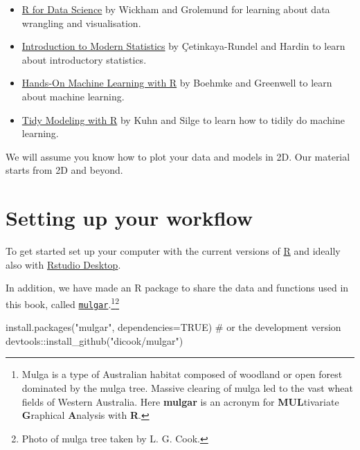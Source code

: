 \documentclass[
  letterpaper,
]{krantz}
\newenvironment{Shaded}{\begin{snugshade}}{\end{snugshade}}
\newcommand{\AttributeTok}[1]{\textcolor[rgb]{0.40,0.45,0.13}{#1}}
\newcommand{\CommentTok}[1]{\textcolor[rgb]{0.37,0.37,0.37}{#1}}
\newcommand{\ConstantTok}[1]{\textcolor[rgb]{0.56,0.35,0.01}{#1}}
\newcommand{\FunctionTok}[1]{\textcolor[rgb]{0.28,0.35,0.67}{#1}}
\newcommand{\NormalTok}[1]{\textcolor[rgb]{0.00,0.23,0.31}{#1}}
\newcommand{\SpecialCharTok}[1]{\textcolor[rgb]{0.37,0.37,0.37}{#1}}
\newcommand{\StringTok}[1]{\textcolor[rgb]{0.13,0.47,0.30}{#1}}
\providecommand{\tightlist}{%
  \setlength{\itemsep}{0pt}\setlength{\parskip}{0pt}}\usepackage{longtable,booktabs,array}
\begin{document}
\begin{itemize}
\tightlist
\item
  \href{https://r4ds.had.co.nz}{R for Data Science} by Wickham and
  Grolemund for learning about data wrangling and visualisation.
\item
  \href{https://openintro-ims.netlify.app}{Introduction to Modern
  Statistics} by Çetinkaya-Rundel and Hardin to learn about introductory
  statistics.
\item
  \href{https://bradleyboehmke.github.io/HOML/}{Hands-On Machine
  Learning with R} by Boehmke and Greenwell to learn about machine
  learning.
\item
  \href{https://www.tmwr.org}{Tidy Modeling with R} by Kuhn and Silge to
  learn how to tidily do machine learning.
\end{itemize}

We will assume you know how to plot your data and models in 2D. Our
material starts from 2D and beyond.

\section*{Setting up your workflow}\label{setting-up-your-workflow}


To get started set up your computer with the current versions of
\href{https://cran.r-project.org}{R} and ideally also with
\href{https://posit.co/download/rstudio-desktop/}{Rstudio Desktop}.

In addition, we have made an R package to share the data and functions
used in this book, called
\href{http://dicook.github.io/mulgar}{\texttt{mulgar}}.\footnote{Mulga
  is a type of Australian habitat composed of woodland or open forest
  dominated by the mulga tree. Massive clearing of mulga led to the vast
  wheat fields of Western Australia. Here \textbf{mulgar} is an acronym
  for \textbf{MUL}tivariate \textbf{G}raphical \textbf{A}nalysis with
  \textbf{R}.}\footnote{Photo of mulga tree taken by L. G. Cook.}

\begin{Shaded}
\begin{Highlighting}[]
\FunctionTok{install.packages}\NormalTok{(}\StringTok{"mulgar"}\NormalTok{, }\AttributeTok{dependencies=}\ConstantTok{TRUE}\NormalTok{)}
\CommentTok{\# or the development version}
\NormalTok{devtools}\SpecialCharTok{::}\FunctionTok{install\_github}\NormalTok{(}\StringTok{"dicook/mulgar"}\NormalTok{)}
\end{Highlighting}
\end{Shaded}
\end{document}
